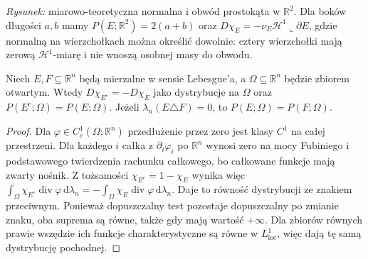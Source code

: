 \begin{center}
\end{center}
\noindent\emph{Rysunek:} miarowo-teoretyczna normalna i obwód
prostokąta w $\mathbb R^2$. Dla boków długości $a,b$
mamy $P(E;\mathbb R^2)=2(a+b)$ oraz
$D\chi_E=-\nu_E\mathcal H^1\llcorner\partial E$,
gdzie normalną na wierzchołkach można określić dowolnie:
cztery wierzchołki mają zerową $\mathcal H^1$-miarę
i nie wnoszą osobnej masy do obwodu.

\begin{lemat}
\label{lem:perimeter-complement-29}
Niech $E,F\subseteq\mathbb R^n$ będą mierzalne
w sensie Lebesgue'a, a $\Omega\subseteq\mathbb R^n$
będzie zbiorem otwartym. Wtedy
$D\chi_{E^c}=-D\chi_E$ jako dystrybucje na $\Omega$
oraz $P(E^c;\Omega)=P(E;\Omega)$.
Jeżeli $\lambda_n(E\triangle F)=0$,
to $P(E;\Omega)=P(F;\Omega)$.
\end{lemat}
\begin{proof}
Dla $\varphi\in C_c^1(\Omega;\mathbb R^n)$
przedłużenie przez zero jest klasy $C^1$ na całej
przestrzeni. Dla każdego $i$ całka z $\partial_i\varphi_i$
po $\mathbb R^n$ wynosi zero na mocy Fubiniego
i podstawowego twierdzenia rachunku całkowego,
bo całkowane funkcje mają zwarty nośnik.
Z tożsamości $\chi_{E^c}=1-\chi_E$ wynika więc
$\int_\Omega\chi_{E^c}\operatorname{div}\varphi
\,\mathrm d\lambda_n=-\int_\Omega\chi_E
\operatorname{div}\varphi\,\mathrm d\lambda_n$.
Daje to równość dystrybucji ze znakiem przeciwnym.
Ponieważ dopuszczalny test pozostaje dopuszczalny
po zmianie znaku, oba suprema są równe, także gdy
mają wartość $+\infty$.
Dla zbiorów równych prawie wszędzie ich funkcje
charakterystyczne są równe w $L^1_{\mathrm{loc}}$,
więc dają tę samą dystrybucję pochodnej.
\end{proof}

